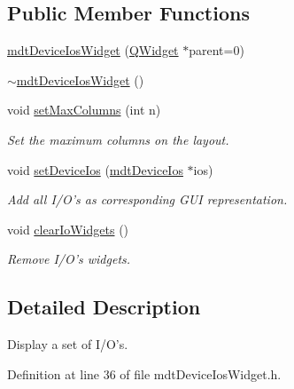 \subsection*{Public Member Functions}
\begin{DoxyCompactItemize}
\item 
\hyperlink{classmdt_device_ios_widget_affd43c16896f0191038911231b52a1fd}{mdt\-Device\-Ios\-Widget} (\hyperlink{class_q_widget}{Q\-Widget} $\ast$parent=0)
\item 
\hyperlink{classmdt_device_ios_widget_a7071f70c3aba15dbfe0eabec5093a4d5}{$\sim$mdt\-Device\-Ios\-Widget} ()
\item 
void \hyperlink{classmdt_device_ios_widget_ad388c95b2bdb48bae976c3fbc2512c30}{set\-Max\-Columns} (int n)
\begin{DoxyCompactList}\small\item\em Set the maximum columns on the layout. \end{DoxyCompactList}\item 
void \hyperlink{classmdt_device_ios_widget_a8fc261333ffc1c3b705ae8609f687159}{set\-Device\-Ios} (\hyperlink{classmdt_device_ios}{mdt\-Device\-Ios} $\ast$ios)
\begin{DoxyCompactList}\small\item\em Add all I/\-O's as corresponding G\-U\-I representation. \end{DoxyCompactList}\item 
void \hyperlink{classmdt_device_ios_widget_af5183009a724c9e8f17cb428fc98b85f}{clear\-Io\-Widgets} ()
\begin{DoxyCompactList}\small\item\em Remove I/\-O's widgets. \end{DoxyCompactList}\end{DoxyCompactItemize}


\subsection{Detailed Description}
Display a set of I/\-O's. 

Definition at line 36 of file mdt\-Device\-Ios\-Widget.\-h.



